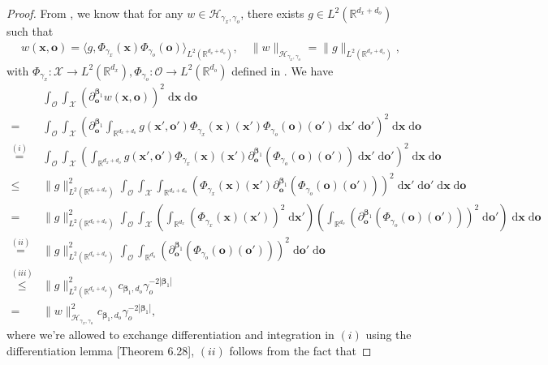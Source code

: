 \documentclass[11pt]{article}
\newcommand{\bx}{\mathbf x}
\newcommand{\bo}{\mathbf o}
\newcommand{\calH}{\mathcal{H}}
\newcommand{\calO}{\mathcal{O}}
\newcommand{\calX}{\mathcal{X}}
\newcommand{\R}{\mathbb{R}}
\newcommand{\0}{\mathbf{0}}
\newcommand{\bbeta}{\boldsymbol\beta}
\begin{document}
\begin{appendix}
\begin{proof}
From \citet[Theorem 4.21]{steinwart2008support}, we know that 
for any $w\in \calH_{\gamma_x,\gamma_o}$, there exists $g\in L^2(\R^{d_x+d_o})$ such that 
\begin{align*}
    w(\bx,\bo) = \langle g, \Phi_{\gamma_x}(\bx)\Phi_{\gamma_o}(\bo)\rangle_{L^2(\R^{d_x+d_o})},\quad \|w\|_{\calH_{\gamma_x,\gamma_o}} = \|g\|_{L^2(\R^{d_x+d_o})},
\end{align*}
with $\Phi_{\gamma_x}: \calX\to L^2(\R^{d_x}), \Phi_{\gamma_o}: \calO\to L^2(\R^{d_o})$ defined in \citet[Lemma 4.45]{steinwart2008support}.
We have
\begin{align*}
    &\int_{\calO} \int_{\calX}\left(\partial^{\bbeta_1}_{\bo}w(\bx,\bo)\right)^2\;\mathrm{d}\bx \;\mathrm{d}\bo\\
    =& \int_{\calO}\int_{\calX}\left(\partial_{\bo}^{\bbeta_1}\int_{\R^{d_x+d_o}} g(\bx',\bo')\Phi_{\gamma_x}(\bx)(\bx')\Phi_{\gamma_o}(\bo)(\bo')\;\mathrm{d}\bx'\;\mathrm{d}\bo'\right)^{2}\;\mathrm{d}\bx\;\mathrm{d}\bo\\
    \stackrel{(i)}{=}& \int_{\calO}\int_{\calX}\left(\int_{\R^{d_x+d_o}} g(\bx',\bo')\Phi_{\gamma_x}(\bx)(\bx')\partial_{\bo}^{\bbeta_1}(\Phi_{\gamma_o}(\bo)(\bo'))\;\mathrm{d}\bx'\;\mathrm{d}\bo'\right)^{2}\;\mathrm{d}\bx\;\mathrm{d}\bo\\
    \leq &  \|g\|^2_{L^2(\R^{d_x+d_o})}\int_{\calO}\int_{\calX}\int_{\R^{d_x+d_o}} \left(\Phi_{\gamma_x}(\bx)(\bx')\partial_{\bo}^{\bbeta_1}(\Phi_{\gamma_o}(\bo)(\bo'))\right)^{2}\;\mathrm{d}\bx'\;\mathrm{d}\bo'\;\mathrm{d}\bx\;\mathrm{d}\bo\\
    = & \|g\|^2_{L^2(\R^{d_x+d_o})}\int_{\calO}\int_{\calX}\left(\int_{\R^{d_x}}(\Phi_{\gamma_x}(\bx)(\bx'))^2\;\mathrm{d}\bx'\right) \left(\int_{\R^{d_o}}\left(\partial_{\bo}^{\bbeta_1}(\Phi_{\gamma_o}(\bo)(\bo'))\right)^{2}\;\mathrm{d}\bo'\right)\;\mathrm{d}\bx\;\mathrm{d}\bo\\
    \stackrel{(ii)}{=} & \|g\|^2_{L^2(\R^{d_x+d_o})}\int_{\calO} \int_{\R^{d_o}}\left(\partial_{\bo}^{\bbeta_1}(\Phi_{\gamma_o}(\bo)(\bo'))\right)^{2}\;\mathrm{d}\bo'\;\mathrm{d}\bo\\
    \stackrel{(iii)}{\leq} & \|g\|^2_{L^2(\R^{d_x+d_o})}c_{\bbeta_1, d_o}\gamma_o^{-2|\bbeta_1|} \\
    = & \|w\|^2_{\calH_{\gamma_x,\gamma_o}} c_{\bbeta_1, d_o}\gamma_o^{-2|\bbeta_1|},
\end{align*}
where we're allowed to exchange differentiation and integration in $(i)$ using the differentiation lemma \cite{klenke2013probability}[Theorem 6.28], $(ii)$ follows from the fact that

\end{proof}
\end{appendix}
\end{document}
